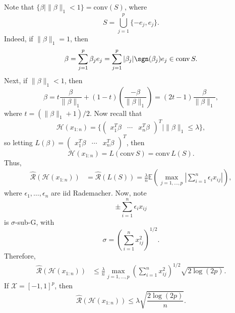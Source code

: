 \documentclass[12pt]{article}
\begin{document}
Note that $\{\beta \mid \|\beta\|_1 < 1\} = \mathrm{conv}(S)$, where
\[
	S = \bigcup_{j = 1}^p \{-e_j, e_j\}.
\]
Indeed, if $\|\beta\|_1 = 1$, then
\begin{align*}
	\beta = \sum_{j = 1}^p \beta_j e_j = \sum_{j =1}^p |\beta_j| \sgn(\beta_j) e_j \in \mathrm{conv}\, S.
\end{align*}
Next, if $\|\beta\|_1 < 1$, then
\[
\beta = t \frac{\beta}{\|\beta\|_1} + (1 - t) \left( \frac{-\beta}{\|\beta\|_1} \right) = (2t - 1) \frac{\beta}{\|\beta\|_1},
\]
where $t = (\|\beta\|_1 + 1)/2$. Now recall that
\[
\mathcal{H}(x_{1:n}) = \{
	\begin{pmatrix}
		x_1^T \beta & \cdots & x_n^T \beta
\end{pmatrix}^T \mid \|\beta\|_1 \leq \lambda\},
\]
so letting $L(\beta) = 
\begin{pmatrix}
	x_1^T \beta & \cdots & x_n^T \beta
\end{pmatrix}^T$, then
\[
\mathcal{H}(x_{1:n}) = L(\mathrm{conv}\, S) = \mathrm{conv}\, L(S).
\]
Thus,
\begin{align*}
	\mathcal{\hat R}(\mathcal{H}(x_{1:n})) &= \mathcal{\hat R}(L(S)) = \frac{\lambda}{n} \mathbb{E} \left( \max_{j = 1, \ldots, p} \left| \sum_{i = 1}^n \epsilon_i x_{ij} \right| \right),
\end{align*}
where $\epsilon_1, \ldots, \epsilon_n$ are iid Rademacher. Now, note
\[
\pm \sum_{i = 1}^n \epsilon_i x_{ij}
\]
is $\sigma$-sub-G, with
\[
\sigma = \left( \sum_{i = 1}^n x_{ij}^2 \right)^{1/2}.
\]
Therefore,
\begin{align*}
	\mathcal{\hat R}(\mathcal{H}(x_{1:n})) &\leq \frac{\lambda}{n} \max_{j = 1, \ldots, p} \left( \sum_{i = 1}^n x_{ij}^2 \right)^{1/2} \sqrt{2 \log (2p)}.
\end{align*}
If $\mathcal{X} = [-1, 1]^p$, then
\[
	\mathcal{\hat R}(\mathcal{H}(x_{1:n})) \leq \lambda \sqrt{\frac{2 \log(2p)}{n}}.
\]
\end{document}
